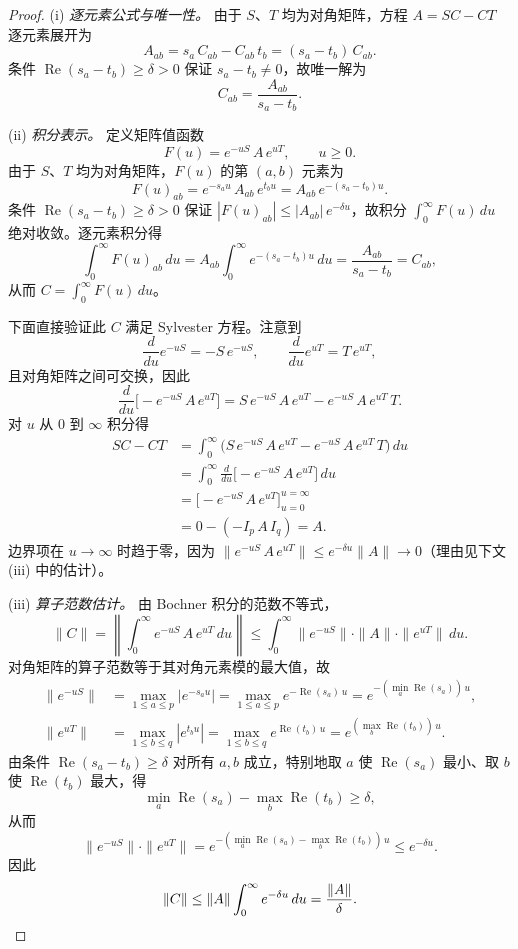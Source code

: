 \documentclass[11pt]{article}
\begin{document}
\begin{proof}
(i) \emph{逐元素公式与唯一性。} 由于 $S$、$T$ 均为对角矩阵，方程 $A = SC - CT$ 逐元素展开为
\[
A_{ab} = s_a\, C_{ab} - C_{ab}\, t_b = (s_a - t_b)\, C_{ab}.
\]
条件 $\operatorname{Re}(s_a - t_b) \ge \delta > 0$ 保证 $s_a - t_b \ne 0$，故唯一解为
\[
C_{ab} = \frac{A_{ab}}{s_a - t_b}.
\]

(ii) \emph{积分表示。} 定义矩阵值函数
\[
F(u) = e^{-uS}\, A\, e^{uT}, \qquad u \ge 0.
\]
由于 $S$、$T$ 均为对角矩阵，$F(u)$ 的第 $(a,b)$ 元素为
\[
F(u)_{ab} = e^{-s_a u}\, A_{ab}\, e^{t_b u} = A_{ab}\, e^{-(s_a - t_b) u}.
\]
条件 $\operatorname{Re}(s_a - t_b) \ge \delta > 0$ 保证 $|F(u)_{ab}| \le |A_{ab}|\, e^{-\delta u}$，故积分 $\int_0^\infty F(u)\, du$ 绝对收敛。逐元素积分得
\[
\int_0^\infty F(u)_{ab}\, du = A_{ab} \int_0^\infty e^{-(s_a - t_b) u}\, du = \frac{A_{ab}}{s_a - t_b} = C_{ab},
\]
从而 $C = \int_0^\infty F(u)\, du$。

下面直接验证此 $C$ 满足 Sylvester 方程。注意到
\[
\frac{d}{du} e^{-uS} = -S\, e^{-uS}, \qquad \frac{d}{du} e^{uT} = T\, e^{uT},
\]
且对角矩阵之间可交换，因此
\[
\frac{d}{du} \bigl[ -e^{-uS}\, A\, e^{uT} \bigr] = S\, e^{-uS}\, A\, e^{uT} - e^{-uS}\, A\, e^{uT}\, T.
\]
对 $u$ 从 $0$ 到 $\infty$ 积分得
\begin{align*}
SC - CT &= \int_0^\infty \bigl( S\, e^{-uS}\, A\, e^{uT} - e^{-uS}\, A\, e^{uT}\, T \bigr)\, du \\
&= \int_0^\infty \frac{d}{du}\bigl[ -e^{-uS}\, A\, e^{uT} \bigr]\, du \\
&= \bigl[ -e^{-uS}\, A\, e^{uT} \bigr]_{u=0}^{u=\infty} \\
&= 0 - (-I_p\, A\, I_q) = A.
\end{align*}
边界项在 $u \to \infty$ 时趋于零，因为 $\| e^{-uS}\, A\, e^{uT} \| \le e^{-\delta u} \|A\| \to 0$（理由见下文 (iii) 中的估计）。

(iii) \emph{算子范数估计。} 由 Bochner 积分的范数不等式，
\[
\|C\| = \left\| \int_0^\infty e^{-uS}\, A\, e^{uT}\, du \right\| \le \int_0^\infty \| e^{-uS} \| \cdot \|A\| \cdot \| e^{uT} \|\, du.
\]
对角矩阵的算子范数等于其对角元素模的最大值，故
\begin{align*}
\| e^{-uS} \| &= \max_{1 \le a \le p} |e^{-s_a u}| = \max_{1 \le a \le p} e^{-\operatorname{Re}(s_a)\, u} = e^{-(\min_a \operatorname{Re}(s_a))\, u}, \\
\| e^{uT} \| &= \max_{1 \le b \le q} |e^{t_b u}| = \max_{1 \le b \le q} e^{\operatorname{Re}(t_b)\, u} = e^{(\max_b \operatorname{Re}(t_b))\, u}.
\end{align*}
由条件 $\operatorname{Re}(s_a - t_b) \ge \delta$ 对所有 $a, b$ 成立，特别地取 $a$ 使 $\operatorname{Re}(s_a)$ 最小、取 $b$ 使 $\operatorname{Re}(t_b)$ 最大，得
\[
\min_a \operatorname{Re}(s_a) - \max_b \operatorname{Re}(t_b) \ge \delta,
\]
从而
\[
\| e^{-uS} \| \cdot \| e^{uT} \| = e^{-(\min_a \operatorname{Re}(s_a) - \max_b \operatorname{Re}(t_b))\, u} \le e^{-\delta u}.
\]
因此
\[
\|C\| \le \|A\| \int_0^\infty e^{-\delta u}\, du = \frac{\|A\|}{\delta}.
\qedhere
\]
\end{proof}
\end{document}
